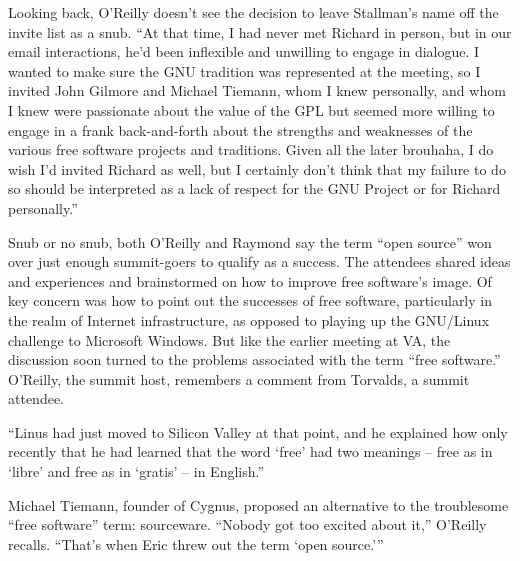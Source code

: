 \ifdefined\chs

\fi

\ifdefined\eng
Looking back, O'Reilly doesn't see the decision to leave Stallman's name off the invite list as a snub. ``At that time, I had never met Richard in person, but in our email interactions, he'd been inflexible and unwilling to engage in dialogue. I wanted to make sure the GNU tradition was represented at the meeting, so I invited John Gilmore and Michael Tiemann, whom I knew personally, and whom I knew were passionate about the value of the GPL but seemed more willing to engage in a frank back-and-forth about the strengths and weaknesses of the various free software projects and traditions. Given all the later brouhaha, I do wish I'd invited Richard as well, but I certainly don't think that my failure to do so should be interpreted as a lack of respect for the GNU Project or for Richard personally.''
\fi

\ifdefined\chs

\fi

\ifdefined\eng
Snub or no snub, both O'Reilly and Raymond say the term ``open source'' won over just enough summit-goers to qualify as a success. The attendees shared ideas and experiences and brainstormed on how to improve free software's image. Of key concern was how to point out the successes of free software, particularly in the realm of Internet infrastructure, as opposed to playing up the GNU/Linux challenge to Microsoft Windows. But like the earlier meeting at VA, the discussion soon turned to the problems associated with the term ``free software.'' O'Reilly, the summit host, remembers a comment from Torvalds, a summit attendee.
\fi

\ifdefined\chs

\fi

\ifdefined\eng
``Linus had just moved to Silicon Valley at that point, and he explained how only recently that he had learned that the word `free' had two meanings -- free as in `libre' and free as in `gratis' -- in English.''
\fi

\ifdefined\chs

\fi

\ifdefined\eng
Michael Tiemann, founder of Cygnus, proposed an alternative to the troublesome ``free software'' term: sourceware. ``Nobody got too excited about it,'' O'Reilly recalls. ``That's when Eric threw out the term `open source.'\hspace{0.01in}''
\fi

\ifdefined\chs

